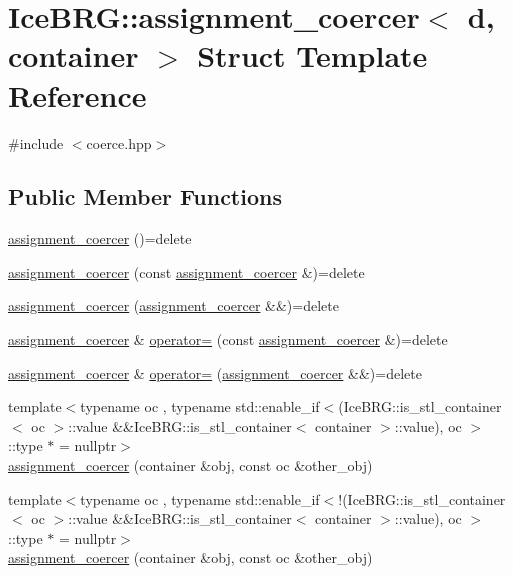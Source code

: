 \hypertarget{structIceBRG_1_1assignment__coercer}{}\section{Ice\+B\+R\+G\+:\+:assignment\+\_\+coercer$<$ d, container $>$ Struct Template Reference}
\label{structIceBRG_1_1assignment__coercer}


{\ttfamily \#include $<$coerce.\+hpp$>$}

\subsection*{Public Member Functions}
\begin{DoxyCompactItemize}
\item 
\hyperlink{structIceBRG_1_1assignment__coercer_a3513d23ca76c9e50b091e0c5e91aa44a}{assignment\+\_\+coercer} ()=delete
\item 
\hyperlink{structIceBRG_1_1assignment__coercer_ad558e38330226f19a1e0e93c0e59e049}{assignment\+\_\+coercer} (const \hyperlink{structIceBRG_1_1assignment__coercer}{assignment\+\_\+coercer} \&)=delete
\item 
\hyperlink{structIceBRG_1_1assignment__coercer_a031c075b714c8f4b2e694d714a523564}{assignment\+\_\+coercer} (\hyperlink{structIceBRG_1_1assignment__coercer}{assignment\+\_\+coercer} \&\&)=delete
\item 
\hyperlink{structIceBRG_1_1assignment__coercer}{assignment\+\_\+coercer} \& \hyperlink{structIceBRG_1_1assignment__coercer_a175bbe2cb99ae3fe9e4f6ce8b4f21af7}{operator=} (const \hyperlink{structIceBRG_1_1assignment__coercer}{assignment\+\_\+coercer} \&)=delete
\item 
\hyperlink{structIceBRG_1_1assignment__coercer}{assignment\+\_\+coercer} \& \hyperlink{structIceBRG_1_1assignment__coercer_ab3f4fe861313dfc9aeb212f4a0c59ad2}{operator=} (\hyperlink{structIceBRG_1_1assignment__coercer}{assignment\+\_\+coercer} \&\&)=delete
\item 
{\footnotesize template$<$typename oc , typename std\+::enable\+\_\+if$<$(\+Ice\+B\+R\+G\+::is\+\_\+stl\+\_\+container$<$ oc $>$\+::value \&\&\+Ice\+B\+R\+G\+::is\+\_\+stl\+\_\+container$<$ container $>$\+::value), oc $>$\+::type $\ast$  = nullptr$>$ }\\\hyperlink{structIceBRG_1_1assignment__coercer_a60696e227f70dd34928f9af6cc8b56f5}{assignment\+\_\+coercer} (container \&obj, const oc \&other\+\_\+obj)
\item 
{\footnotesize template$<$typename oc , typename std\+::enable\+\_\+if$<$!(\+Ice\+B\+R\+G\+::is\+\_\+stl\+\_\+container$<$ oc $>$\+::value \&\&\+Ice\+B\+R\+G\+::is\+\_\+stl\+\_\+container$<$ container $>$\+::value), oc $>$\+::type $\ast$  = nullptr$>$ }\\\hyperlink{structIceBRG_1_1assignment__coercer_a60696e227f70dd34928f9af6cc8b56f5}{assignment\+\_\+coercer} (container \&obj, const oc \&other\+\_\+obj)
\end{DoxyCompactItemize}


